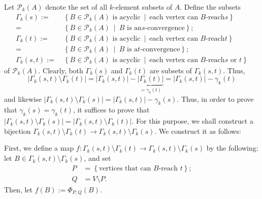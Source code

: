 \documentclass[numbers=enddot,12pt,final,onecolumn,notitlepage]{scrartcl}%
\theoremstyle{definition}
\theoremstyle{plainsl}
\begin{document}
Let $\mathcal{P}_{k}\left(  A\right)  $ denote the set of all $k$-element
subsets of $A$. Define the subsets
\begin{align*}
\Gamma_{k}\left(  s\right)  :=  &  \ \left\{  B\in\mathcal{P}_{k}\left(
A\right)  \text{ is acyclic}\ \mid\ \text{each vertex can }B\text{-reach
}s\right\} \\
=  &  \ \left\{  B\in\mathcal{P}_{k}\left(  A\right)  \ \mid\ B\text{ is an
}s\text{-convergence}\right\}  ;\\
\Gamma_{k}\left(  t\right)  :=  &  \ \left\{  B\in\mathcal{P}_{k}\left(
A\right)  \text{ is acyclic}\ \mid\ \text{each vertex can }B\text{-reach
}t\right\} \\
=  &  \ \left\{  B\in\mathcal{P}_{k}\left(  A\right)  \ \mid\ B\text{ is a
}t\text{-convergence}\right\}  ;\\
\Gamma_{k}\left(  s,t\right)  :=  &  \ \left\{  B\in\mathcal{P}_{k}\left(
A\right)  \text{ is acyclic}\ \mid\ \text{each vertex can }B\text{-reach
}s\text{ or }t\right\}
\end{align*}
of $\mathcal{P}_{k}\left(  A\right)  $. Clearly, both $\Gamma_{k}\left(
s\right)  $ and $\Gamma_{k}\left(  t\right)  $ are subsets of $\Gamma
_{k}\left(  s,t\right)  $. Thus,
\[
\left\vert \Gamma_{k}\left(  s,t\right)  \setminus\Gamma_{k}\left(  t\right)
\right\vert =\left\vert \Gamma_{k}\left(  s,t\right)  \right\vert
-\underbrace{\left\vert \Gamma_{k}\left(  t\right)  \right\vert }_{=\gamma
_{k}\left(  t\right)  }=\left\vert \Gamma_{k}\left(  s,t\right)  \right\vert
-\gamma_{k}\left(  t\right)
\]
and likewise $\left\vert \Gamma_{k}\left(  s,t\right)  \setminus\Gamma
_{k}\left(  s\right)  \right\vert =\left\vert \Gamma_{k}\left(  s,t\right)
\right\vert -\gamma_{k}\left(  s\right)  $. Thus, in order to prove that
$\gamma_{k}\left(  s\right)  =\gamma_{k}\left(  t\right)  $, it suffices to
prove that $\left\vert \Gamma_{k}\left(  s,t\right)  \setminus\Gamma
_{k}\left(  s\right)  \right\vert =\left\vert \Gamma_{k}\left(  s,t\right)
\setminus\Gamma_{k}\left(  t\right)  \right\vert $. For this purpose, we shall
construct a bijection $\Gamma_{k}\left(  s,t\right)  \setminus\Gamma
_{k}\left(  t\right)  \rightarrow\Gamma_{k}\left(  s,t\right)  \setminus
\Gamma_{k}\left(  s\right)  $. We construct it as follows:

First, we define a map $f : \Gamma_{k}(s,t) \setminus \Gamma_{k}(t) \to \Gamma_{k}(s,t) \setminus \Gamma_{k}(s)$ by the following: let $B \in \Gamma_{k}(s,t) \setminus \Gamma_{k}(s)$, and set%
\begin{align*}
P &  =\left\{  \text{vertices that can }B\text{-reach }t\right\}  ;\\
Q &  =V\setminus P.
\end{align*} Then, let $f(B) := \Phi_{P,Q}(B)$.
\end{document}
